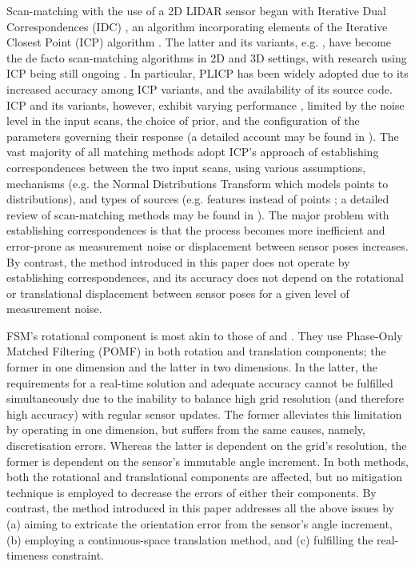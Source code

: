 Scan-matching with the use of a 2D LIDAR sensor began with Iterative Dual
Correspondences (IDC) \cite{FengLu1994}, an algorithm incorporating elements of
the Iterative Closest Point (ICP) algorithm \cite{Besl1992b}. The latter and
its variants, e.g.  \cite{Pfister,Chetverikov,Censi2008b,Segal2009}, have
become the de facto scan-matching algorithms in 2D and 3D settings, with
research using ICP being still ongoing
\cite{Wang2018a,Tian2019a,Marchel2020,Koide2021}. In particular, PLICP
\cite{Censi2008b} has been widely adopted due to its increased accuracy among
ICP variants, and the availability of its source code. ICP and its variants,
however, exhibit varying performance \cite{Donoso2017a}, limited by the noise
level in the input scans, the choice of prior, and the configuration of the
parameters governing their response (a detailed account may be found in
\cite{Filotheou2022a}). The vast majority of all matching methods adopt ICP's
approach of establishing correspondences between the two input scans, using
various assumptions, mechanisms (e.g. the Normal Distributions Transform
\cite{Biber,Bouraine2020} which models points to distributions), and types of
sources (e.g. features instead of points \cite{Wang2018b}; a detailed review of
scan-matching methods may be found in \cite{Filotheou2020a}). The major problem
with establishing correspondences is that the process becomes more inefficient
and error-prone as measurement noise or displacement between sensor poses
increases. By contrast, the method introduced in this paper does not operate by
establishing correspondences, and its accuracy does not depend on the
rotational or translational displacement between sensor poses for a given level
of measurement noise.

FSM's rotational component is most akin to those of
\cite{Yu2018} and \cite{Jiang2018}. They use Phase-Only Matched Filtering
(POMF) \cite{Qin-ShengChen1994} in both rotation and translation components;
the former in one dimension and the latter in two dimensions. In the latter,
the requirements for a real-time solution and adequate accuracy cannot be
fulfilled simultaneously due to the inability to balance high grid resolution
(and therefore high accuracy) with regular sensor updates. The former
alleviates this limitation by operating in one dimension, but suffers from the
same causes, namely, discretisation errors. Whereas the latter is dependent on
the grid's resolution, the former is dependent on the sensor's immutable angle
increment.  In both methods, both the rotational and translational components
are affected, but no mitigation technique is employed to decrease the errors of
either their components. By contrast, the method introduced in this paper
addresses all the above issues by (a) aiming to extricate the orientation error
from the sensor's angle increment, (b) employing a continuous-space translation
method, and (c) fulfilling the real-timeness constraint.
